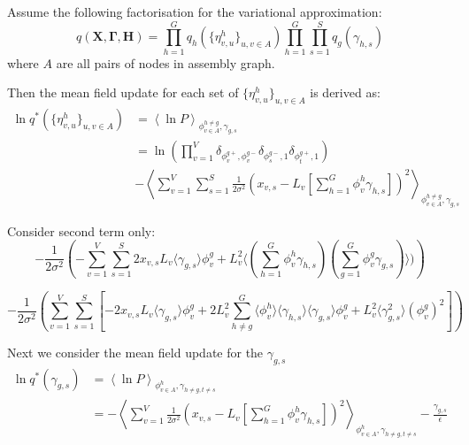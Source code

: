 \documentclass[10pt]{article}
\begin{document}
Assume the following factorisation for the variational approximation:
\begin{equation}
q(\mathbf{X},\mathbf{\Gamma},\mathbf{H})  =  \prod_{h=1}^G q_h(\{ \eta^h_{v,u} \} _{u,v \in A}) \prod_{h=1}^G \prod_{s=1}^S q_g(\gamma_{h,s})
\end{equation}
where $A$ are all pairs of nodes in assembly graph.

Then the mean field update for each set of $ \{\eta^h_{v,u}\}_{u,v \in A}$ is derived as:
\begin{align}
\ln q^*( \{ \eta^h_{v,u} \} _{u,v \in A}) & =  \left\langle \ln P \right\rangle _{ \phi^{h \neq g}_{v \in A},\gamma_{g,s}} \\
& =  \ln \left( \prod_{v=1}^V \delta_{ \phi^{g+}_v, \phi^{g-}_v} \delta_{\phi^{g-}_s,1}  \delta_{\phi^{g+}_t,1} \right)\\
& -  \left\langle \sum_{v=1}^V \sum_{s=1}^S \frac{1}{2\sigma^2}\left( x_{v,s} - L_v[\sum_{h=1}^G \phi^h_v \gamma_{h,s}] \right)^2 \right\rangle _{ \phi^{h \neq g}_{v \in A},\gamma_{g,s}}
\end{align}

Consider second term only:
\begin{equation}
 - \frac{1}{2\sigma^2}\left ( 
- \sum_{v=1}^V \sum_{s=1}^S 2 x_{v,s} L_v \langle \gamma_{g,s} \rangle \phi^{g}_v
+ L_v^2 \langle (\sum_{h=1}^G \phi^h_v \gamma_{h,s}) (\sum_{g=1}^G \phi^g_v \gamma_{g,s}) \rangle)
\right )
\end{equation}

\begin{equation}
 - \frac{1}{2\sigma^2}\left ( 
 \sum_{v=1}^V \sum_{s=1}^S \left [ -2 x_{v,s} L_v \langle \gamma_{g,s} \rangle \phi^{g}_v
+ 2 L_v^ 2 \sum_{h \neq g }^G \langle \phi^h_v \rangle \langle \gamma_{h,s} \rangle \langle \gamma_{g,s} \rangle \phi^{g}_v
+ L_v^2 \langle \gamma_{g,s}^2 \rangle (\phi^{g}_v)^2
\right]
\right )
\end{equation}

Next we consider the mean field update for the $\gamma_{g,s}$
\begin{align}
\ln q^*(\gamma_{g,s}) & =  \left\langle \ln P \right\rangle_{ \phi^{h}_{v \in A},\gamma_{h \neq g,t \neq s}} \\
& =  - \left\langle \sum_{v=1}^V \frac{1}{2\sigma^2}\left( x_{v,s} - L_v[\sum_{h=1}^G \phi^h_v \gamma_{h,s}] \right)^2 \right\rangle _{\phi^{h}_{v \in A},\gamma_{h \neq g,t \neq s}} - \frac{\gamma_{g,s}}{\epsilon}
\end{align}
\end{document}
